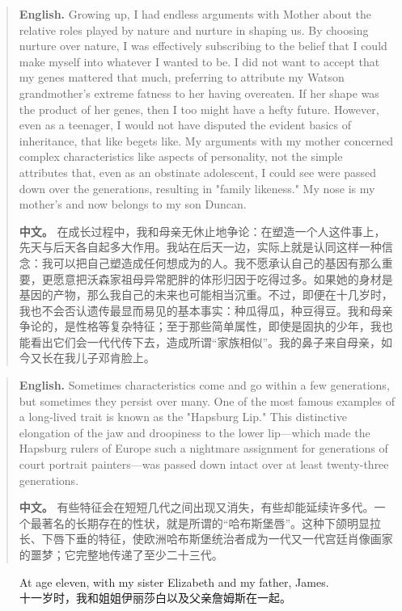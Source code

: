\begin{quote}
\noindent\textbf{English.} Growing up, I had endless arguments with Mother about the relative roles played by nature and nurture in shaping us. By choosing nurture over nature, I was effectively subscribing to the belief that I could make myself into whatever I wanted to be. I did not want to accept that my genes mattered that much, preferring to attribute my Watson grandmother's extreme fatness to her having overeaten. If her shape was the product of her genes, then I too might have a hefty future. However, even as a teenager, I would not have disputed the evident basics of inheritance, that like begets like. My arguments with my mother concerned complex characteristics like aspects of personality, not the simple attributes that, even as an obstinate adolescent, I could see were passed down over the generations, resulting in "family likeness." My nose is my mother's and now belongs to my son Duncan.

\smallskip
\noindent\textbf{中文。} 在成长过程中，我和母亲无休止地争论：在塑造一个人这件事上，先天与后天各自起多大作用。我站在后天一边，实际上就是认同这样一种信念：我可以把自己塑造成任何想成为的人。我不愿承认自己的基因有那么重要，更愿意把沃森家祖母异常肥胖的体形归因于吃得过多。如果她的身材是基因的产物，那么我自己的未来也可能相当沉重。不过，即便在十几岁时，我也不会否认遗传最显而易见的基本事实：种瓜得瓜，种豆得豆。我和母亲争论的，是性格等复杂特征；至于那些简单属性，即使是固执的少年，我也能看出它们会一代代传下去，造成所谓“家族相似”。我的鼻子来自母亲，如今又长在我儿子邓肯脸上。
\end{quote}

\begin{quote}
\noindent\textbf{English.} Sometimes characteristics come and go within a few generations, but sometimes they persist over many. One of the most famous examples of a long-lived trait is known as the "Hapsburg Lip." This distinctive elongation of the jaw and droopiness to the lower lip---which made the Hapsburg rulers of Europe such a nightmare assignment for generations of court portrait painters---was passed down intact over at least twenty-three generations.

\smallskip
\noindent\textbf{中文。} 有些特征会在短短几代之间出现又消失，有些却能延续许多代。一个最著名的长期存在的性状，就是所谓的“哈布斯堡唇”。这种下颌明显拉长、下唇下垂的特征，使欧洲哈布斯堡统治者成为一代又一代宫廷肖像画家的噩梦；它完整地传递了至少二十三代。
\end{quote}

\begin{figure}[htbp]
\centering
{}
\caption{At age eleven, with my sister Elizabeth and my father, James.\\十一岁时，我和姐姐伊丽莎白以及父亲詹姆斯在一起。}
\end{figure}

